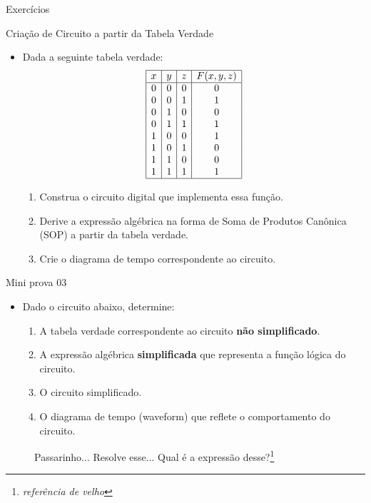 \begin{frame}{Exercícios}
	\par Criação de Circuito a partir da Tabela Verdade
	\begin{itemize}
		\item Dada a seguinte tabela verdade:
		\[
		\begin{array}{|c|c|c|c|}
			\hline
			x & y & z & F(x, y, z) \\
			\hline
			0 & 0 & 0 & 0 \\
			0 & 0 & 1 & 1 \\
			0 & 1 & 0 & 0 \\
			0 & 1 & 1 & 1 \\
			1 & 0 & 0 & 1 \\
			1 & 0 & 1 & 0 \\
			1 & 1 & 0 & 0 \\
			1 & 1 & 1 & 1 \\
			\hline
		\end{array}
		\]
		\begin{enumerate}
			\item Construa o circuito digital que implementa essa função.
			\item Derive a expressão algébrica na forma de Soma de Produtos Canônica (SOP) a partir da tabela verdade.
			\item Crie o diagrama de tempo correspondente ao circuito.
		\end{enumerate}
	\end{itemize}
\end{frame}

\begin{frame}{Mini prova 03}
	\begin{itemize}
		\item Dado o circuito abaixo, determine:
		\begin{enumerate}
			\item A tabela verdade correspondente ao circuito \textbf{não simplificado}.
			\item A expressão algébrica \textbf{simplificada} que representa a função lógica do circuito.
			\item O circuito simplificado.
			\item O diagrama de tempo (waveform) que reflete o comportamento do circuito.
		\end{enumerate}
	\end{itemize}
	\begin{figure}
		\centering
		
		\caption{Passarinho... Resolve esse... Qual é a expressão desse?\footnote[frame]{\textit{referência de velho}}}
		\label{fig:05exe}
	\end{figure}
\end{frame}